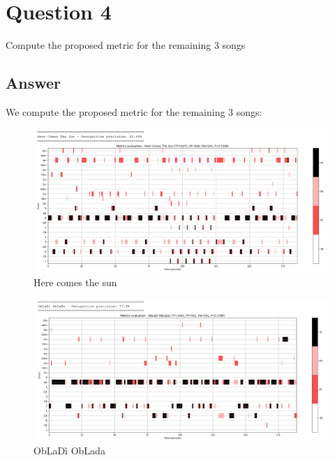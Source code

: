 \documentclass[
	12pt, %
]{fphw}
\begin{document}

\section*{Question 4}

\begin{problem}
	Compute the proposed metric for the remaining 3 songs
\end{problem}

\subsection*{Answer}

We compute the proposed metric for the remaining 3 songs:

\begin{figure}[H]
 \centering
 \includegraphics[scale=1]{./images/4_here_comes_the_sun_metrics.png}
 \caption{Here comes the sun}
\end{figure}

\begin{figure}[H]
 \centering
 \includegraphics[scale=1]{./images/4_obladi_oblada_metrics.png}
 \caption{ObLaDì ObLada}
\end{figure}
\end{document}
